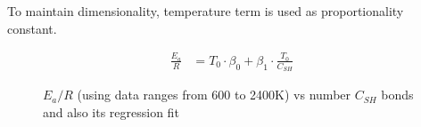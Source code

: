 \documentclass[preprint,12pt]{elsarticle}
\begin{document}
		To maintain dimensionality, temperature term is used as proportionality constant. 
		
		\begin{equation}\label{eq:formulation_Ea}
		\begin{aligned}
		\frac{E_a}{R} &= T_0 \cdot \beta_0 + \beta_1 \cdot \frac{T_0}{C_{SH}}
		\end{aligned}
		\end{equation}
		
			
	
		\begin{figure}[H]\label{fig:Ea_Full}
			{
				\hspace{0.25cm}
				\caption{$E_a/R$ (using data ranges from 600 to 2400K) vs number $C_{SH}$ bonds and also its regression fit}
			}
		\end{figure}
		
\end{document}
